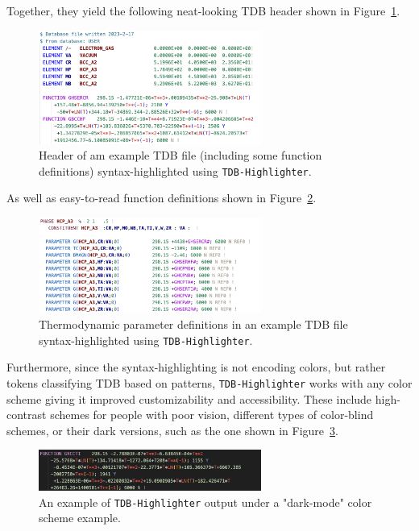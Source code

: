 Together, they yield the following neat-looking TDB header shown in Figure~\ref{osoft:fig:tdbheader}.

\begin{figure}[H]
    \centering
    \includegraphics[width=0.65\textwidth]{tangentialsoft/Fig1.png}
    \caption{Header of am example TDB file (including some function definitions) syntax-highlighted using \texttt{TDB-Highlighter}.}
    \label{osoft:fig:tdbheader}
\end{figure}

As well as easy-to-read function definitions shown in Figure~\ref{osoft:fig:tdbfunctions}.

\begin{figure}[H]
    \centering
    \includegraphics[width=0.65\textwidth]{tangentialsoft/Fig2-2.png}
    \caption{Thermodynamic parameter definitions in an example TDB file syntax-highlighted using \texttt{TDB-Highlighter}.}
    \label{osoft:fig:tdbfunctions}
\end{figure}

Furthermore, since the syntax-highlighting is not encoding colors, but rather tokens classifying TDB based on patterns, \texttt{TDB-Highlighter} works with any color scheme giving it improved customizability and accessibility. These include high-contrast schemes for people with poor vision, different types of color-blind schemes, or their dark versions, such as the one shown in Figure~\ref{osoft:fig:tdbdarkmode}.

\begin{figure}[H]
    \centering
    \includegraphics[width=0.65\textwidth]{tangentialsoft/Fig3.png}
    \caption{An example of \texttt{TDB-Highlighter} output under a "dark-mode" color scheme example.}
    \label{osoft:fig:tdbdarkmode}
\end{figure}

